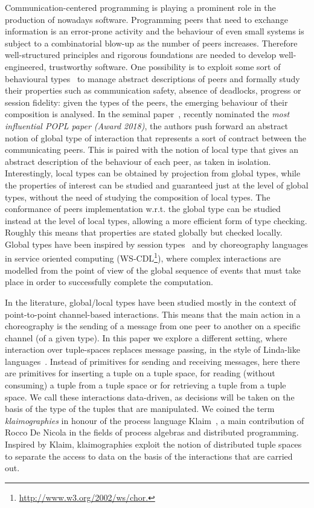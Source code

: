 
Communication-centered programming is playing a prominent role in the
production of nowadays software. Programming peers that need to
exchange information is an error-prone activity and the behaviour of
even small systems is subject to a combinatorial blow-up as the number
of peers increases.  Therefore well-structured principles and rigorous
foundations are needed to develop well-engineered, trustworthy
software.  One possibility is to exploit some sort of behavioural
types~\cite{DBLP:journals/csur/HuttelLVCCDMPRT16,dd09} to manage
abstract descriptions of peers and formally study their properties
such as communication safety, absence of deadlocks, progress or
session fidelity: given the types of the peers, the emerging behaviour
of their composition is analysed.  In the seminal
paper~\cite{DBLP:conf/popl/HondaYC08}, recently nominated the
\emph{most influential POPL paper (Award 2018)}, the authors push
forward an abstract notion of global type of interaction that
represents a sort of contract between the communicating peers. This is
paired with the notion of local type that gives an abstract
description of the behaviour of each peer, as taken in isolation.
Interestingly, local types can be obtained  by
projection from global types, while the properties of interest can be
studied and guaranteed just at the level of global types, without the
need of studying the composition of local types. The conformance of
peers implementation w.r.t. the global type can be studied instead at
the level of local types, allowing a more efficient form of type
checking. Roughly this means that properties are stated globally but
checked locally. Global types have been inspired by session
types~\cite{DBLP:conf/esop/HondaVK98} and by choreography languages in
service oriented computing
(WS-CDL\footnote{\url{http://www.w3.org/2002/ws/chor.}}), where
complex interactions are modelled from the point of view of the global
sequence of events that must take place in order to successfully
complete the computation.

In the literature, global/local types have been studied mostly in the
context of point-to-point channel-based interactions. This means that
the main action in a choreography is the sending of a message from one
peer to another on a specific channel (of a given type). In this paper
we explore a different setting, where interaction over tuple-spaces
replaces message passing, in the style of Linda-like
languages~\cite{DBLP:journals/toplas/Gelernter85}.  Instead of
primitives for sending and receiving messages, here there are
primitives for inserting a tuple on a tuple space, for reading
(without consuming) a tuple from a tuple space or for retrieving a
tuple from a tuple space. We call these interactions data-driven, as
decisions will be taken on the basis of the type of the tuples that
are manipulated.
%
We coined the term \emph{klaimographies} in honour of the process
language Klaim~\cite{DBLP:journals/tse/NicolaFP98,klaim}, a main
contribution of Rocco De Nicola in the fields of process algebras and
distributed programming.
%
Inspired by Klaim, klaimographies exploit the notion of distributed
tuple spaces to separate the access to data on the basis of the
interactions that are carried out.

